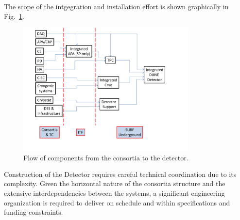 The scope of the intgegration and installation effort is shown
graphically in Fig.~\ref{fig:TC_flow}.
\begin{figure}[htb]
  \begin{center}
    \includegraphics[width=0.8\textwidth]{far-detector-generic/figures/DUNE_deliverable_flow}
    \caption{Flow of components from the consortia to the detector.}
    \label{fig:TC_flow}
  \end{center}
\end{figure}





Construction of the  Detector
requires careful technical coordination due to its complexity.
Given the horizontal nature of the consortia structure and the
extensive interdependencies between the systems, a significant
engineering organization is required to deliver  on
schedule and within specifications and funding constraints.


